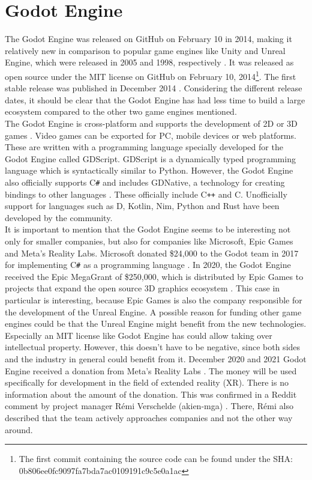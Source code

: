 \section{Godot Engine}
The Godot Engine was released on GitHub on February 10 in 2014, making it relatively new in comparison to popular game engines like Unity and Unreal Engine, which were released in 2005 and 1998, respectively \cite{unity-release, unreal-release}.
It was released as open source under the MIT license on GitHub on February 10, 2014\footnote{The first commit containing the source code can be found under the SHA:\\ 0b806ee0fc9097fa7bda7ac0109191c9c5e0a1ac}\cite{godot-repository}.
The first stable release was published in December 2014 \cite{godot-release}.
Considering the different release dates, it should be clear that the Godot Engine has had less time to build a large ecosystem compared to the other two game engines mentioned.\\

The Godot Engine is cross-platform and supports the development of 2D or 3D games \cite{godot-engine}.
Video games can be exported for PC, mobile devices or web platforms.
These are written with a programming language specially developed for the Godot Engine called GDScript.
GDScript is a dynamically typed programming language which is syntactically similar to Python.
However, the Godot Engine also officially supports C\texttt{\#} and includes GDNative, a technology for creating bindings to other languages \cite{godot-gdnative}.
These officially include C\texttt{++} and C.
Unofficially support for languages such as D, Kotlin, Nim, Python and Rust have been developed by the community.\\

It is important to mention that the Godot Engine seems to be interesting not only for smaller companies, but also for companies like Microsoft, Epic Games and Meta's Reality Labs.
Microsoft donated \$24,000 to the Godot team in 2017 for implementing C\texttt{\#} as a programming language \cite{godot-csharp}.
In 2020, the Godot Engine received the Epic MegaGrant of \$250,000, which is distributed by Epic Games to projects that expand the open source 3D graphics ecosystem \cite{godot-megagrant}.
This case in particular is interesting, because Epic \linebreak Games is also the company responsible for the development of the Unreal Engine.
A possible reason for funding other game engines could be that the Unreal Engine might benefit from the new technologies.
Especially an MIT license like Godot Engine has could allow taking over intellectual property.
However, this doesn't have to be negative, since both sides and the industry in general could benefit from it.
December 2020 and 2021 Godot Engine received a donation from Meta's Reality Labs \cite{godot-facebook-reality, godot-meta-reality}.
The money will be used specifically for development in the field of extended reality (XR).
There is no information about the amount of the donation.
This was confirmed in a Reddit comment by project manager Rémi Verschelde (akien-mga) \cite{reddit-companies-akien}.
There, Rémi also described that the team actively approaches companies and not the other way around.
